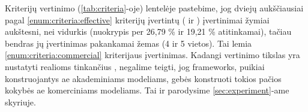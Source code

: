 \begin{criteriaTable}
\end{criteriaTable}

Kriterijų vertinimo (\ref{tab:criteria}-oje) lentelėje pastebime, jog dviejų aukščiausiai pagal \ref{enum:criteria:effective} kriterijų įvertintų  ( ir ) įvertinimai žymiai aukštesni, nei vidurkis (nuokrypis per 26,79 \% ir 19,21 \% atitinkamai), tačiau bendras jų įvertinimas pakankamai žemas (4 ir 5 vietos). Tai lemia \ref{enum:criteria:commercial} kriterijaus įvertinimas. Kadangi vertinimo tikslas yra nustatyti realioms  tinkančius , negalime teigti, jog \glspl{framework}, puikiai konstruojantys \acs{ae} akademiniams modeliams, gebės konstruoti tokios pačios kokybės \acs{ae} komerciniams modeliams. Tai ir parodysime \ref{sec:experiment}-ame skyriuje. 
